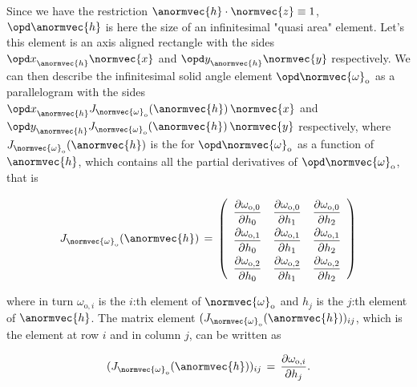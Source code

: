 {Since we have the restriction $\anormvec{h}\cdot\normvec{z}\equiv 1$, $\opd\anormvec{h}$ is here the size of an infinitesimal "quasi area" element. Let's \assume this element is an axis aligned rectangle with the sides $\opd x_{\anormvec{h}}^{\,}\normvec{x}$ and $\opd y_{\anormvec{h}}^{\,}\normvec{y}$ respectively. We can then describe the infinitesimal solid angle element $\opd\normvec{\omega}_{\text{o}}$ as a parallelogram with the sides $\opd x_{\anormvec{h}}^{\,}J_{\normvec{\omega}_{\text{o}}}(\anormvec{h})^{\,}\normvec{x}$ and $\opd y_{\anormvec{h}}^{\,}J_{\normvec{\omega}_{\text{o}}}(\anormvec{h})^{\,}\normvec{y}$ respectively, where $J_{\normvec{\omega}_{\text{o}}}(\anormvec{h})$ is the  for $\opd\normvec{\omega}_{\text{o}}$ as a function of $\anormvec{h}$, which contains all the partial derivatives of $\opd\normvec{\omega}_{\text{o}}$, that is

\begin{equation} \label{eq:jacobian_matrix}
J_{\normvec{\omega}_{\text{o}}}(\anormvec{h}) \,=\, \renewcommand*{\arraystretch}{2} \left( \begin{array}{ccc}
\displaystyle \frac{\partial\omega_{\text{o},0}}{\partial h_0} &
\displaystyle \frac{\partial\omega_{\text{o},0}}{\partial h_1} &
\displaystyle \frac{\partial\omega_{\text{o},0}}{\partial h_2} \\
\displaystyle \frac{\partial\omega_{\text{o},1}}{\partial h_0} &
\displaystyle \frac{\partial\omega_{\text{o},1}}{\partial h_1} &
\displaystyle \frac{\partial\omega_{\text{o},1}}{\partial h_2} \\
\displaystyle \frac{\partial\omega_{\text{o},2}}{\partial h_0} &
\displaystyle \frac{\partial\omega_{\text{o},2}}{\partial h_1} &
\displaystyle \frac{\partial\omega_{\text{o},2}}{\partial h_2} 
\end{array} \right)
\end{equation}

where in turn $\omega_{\text{o},i}$ is the $i$:th element of $\normvec{\omega}_{\text{o}}$ and $h_{j}$ is the $j$:th element of $\anormvec{h}$. The matrix element $(J_{\normvec{\omega}_{\text{o}}}(\anormvec{h}))_{ij}$, which is the element at row $i$ and in column $j$, can be written as

\begin{equation} \label{eq:jacobian_matrix_component}
(J_{\normvec{\omega}_{\text{o}}}(\anormvec{h}))_{ij} \,=\, \frac{\partial\omega_{\text{o},i}}{\partial h_{j}}.
\end{equation}

}
